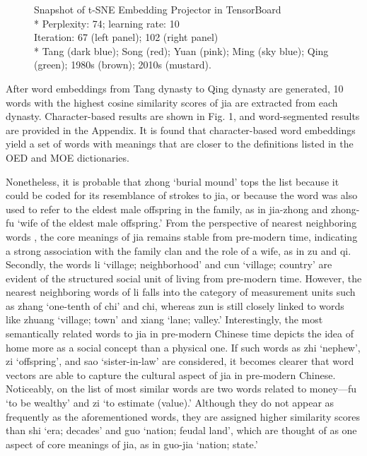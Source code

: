 \begin{figure}[H]
\begin{minipage}[b]{0.45\linewidth}
\end{minipage}
\caption[Snapshot of t-SNE Embedding Projector in TensorBoard]{Snapshot of t-SNE Embedding Projector in TensorBoard\\\footnotesize{* Perplexity: 74; learning rate: 10\\Iteration: 67 (left panel); 102 (right panel)\\* Tang (dark blue); Song (red); Yuan (pink); Ming (sky blue); Qing (green); 1980s (brown); 2010s (mustard).}}
\end{figure}

After word embeddings from Tang dynasty to Qing dynasty are generated, 10 words with the highest cosine similarity scores of jia are extracted from each dynasty. Character-based results are shown in Fig. 1, and word-segmented results are provided in the Appendix. It is found that character-based word embeddings yield a set of words with meanings that are closer to the definitions listed in the OED and MOE dictionaries.

Nonetheless, it is probable that zhong `burial mound' tops the list because it could be coded for its resemblance of strokes to jia, or because the word was also used to refer to the eldest male offspring in the family, as in jia-zhong and zhong-fu `wife of the eldest male offspring.' From the perspective of nearest neighboring words \parencite{hamilton2016cultural}, the core meanings of jia remains stable from pre-modern time, indicating a strong association with the family clan and the role of a wife, as in zu and qi. Secondly, the words li `village; neighborhood' and cun `village; country' are evident of the structured social unit of living from pre-modern time. However, the nearest neighboring words of li falls into the category of measurement units such as zhang `one-tenth of chi' and chi, whereas zun is still closely linked to words like zhuang `village; town' and xiang `lane; valley.' Interestingly, the most semantically related words to jia in pre-modern Chinese time depicts the idea of home more as a social concept than a physical one. If such words as zhi `nephew', zi `offspring', and sao `sister-in-law' are considered, it becomes clearer that word vectors are able to capture the cultural aspect of jia in pre-modern Chinese. 
Noticeably, on the list of most similar words are two words related to money—fu `to be wealthy' and zi `to estimate (value).' Although they do not appear as frequently as the aforementioned words, they are assigned higher similarity scores than shi `era; decades' and guo `nation; feudal land', which are thought of as one aspect of core meanings of jia, as in guo-jia `nation; state.'

